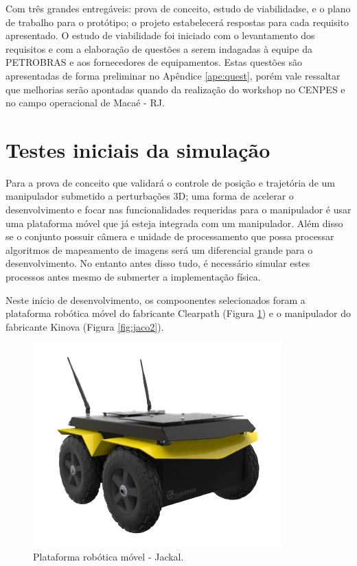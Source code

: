 Com três grandes entregáveis: prova de conceito, estudo de viabilidadse, e o plano de trabalho para o protótipo; o projeto estabelecerá respostas para cada requisito apresentado. O estudo de viabilidade foi iniciado com o levantamento dos requisitos e com a elaboração de questões a serem indagadas à equipe da PETROBRAS e aos fornecedores de equipamentos. Estas questões são apresentadas de forma preliminar no Apêndice \ref{ape:quest}, porém vale ressaltar que melhorias serão apontadas quando da realização do workshop no CENPES e no campo operacional de Macaé - RJ.

\section{Testes iniciais da simulação}
\label{sec:tstsim}
Para a prova de conceito que validará o controle de posição e trajetória de um manipulador submetido a perturbações 3D; uma forma de acelerar o desenvolvimento e focar nas funcionalidades requeridas para o manipulador é usar uma plataforma móvel que já esteja integrada com um manipulador. Além disso se o conjunto possuir câmera e unidade de processamento que possa processar algoritmos de mapeamento de imagens será um diferencial grande para o desenvolvimento. No entanto antes disso tudo, é necessário simular estes processos antes mesmo de submerter a implementação física.

Neste início de desenvolvimento, os compoonentes selecionados foram a plataforma robótica móvel do fabricante Clearpath  (Figura \ref{fig:jackal}) e o manipulador do fabricante Kinova (Figura \ref{fig:jaco2}).
\begin{figure}[H] 
  \begin{center} 
  	\includegraphics[width=0.5 \textwidth]{images/jackal.png} 
  \end{center} 
  \caption{Plataforma robótica móvel - Jackal.} 
  \label{fig:jackal} 
\end{figure}

